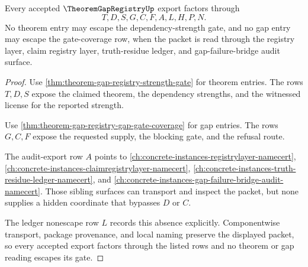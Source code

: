 \begin{theorem}
\label{thm:theorem-gap-registry-ledger-nonescape}
Every accepted $\TheoremGapRegistryUp$ export factors through
$$
T,D,S,G,C,F,A,L,H,P,N.
$$
No theorem entry may escape the dependency-strength gate, and no gap entry may escape the gate-coverage row, when the packet is read through the registry layer, claim registry layer, truth-residue ledger, and gap-failure-bridge audit surface.
\end{theorem}
\begin{proof}
Use \autoref{thm:theorem-gap-registry-strength-gate} for theorem entries. The rows $T,D,S$ expose the claimed theorem, the dependency strengths, and the witnessed license for the reported strength.

Use \autoref{thm:theorem-gap-registry-gap-gate-coverage} for gap entries. The rows $G,C,F$ expose the requested supply, the blocking gate, and the refusal route.

The audit-export row $A$ points to \autoref{ch:concrete-instances-registrylayer-namecert}, \autoref{ch:concrete-instances-claimregistrylayer-namecert}, \autoref{ch:concrete-instances-truth-residue-ledger-namecert}, and \autoref{ch:concrete-instances-gap-failure-bridge-audit-namecert}. Those sibling surfaces can transport and inspect the packet, but none supplies a hidden coordinate that bypasses $D$ or $C$.

The ledger nonescape row $L$ records this absence explicitly. Componentwise transport, package provenance, and local naming preserve the displayed packet, so every accepted export factors through the listed rows and no theorem or gap reading escapes its gate.
\end{proof}

